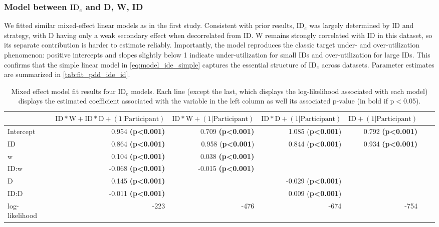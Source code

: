 \documentclass[acmlarge, manuscript,review]{acmart}
\newcommand{\ide}{\ensuremath{{\text{ID}_e}}\xspace}
\newcommand{\D}{\ensuremath{{\text{D}}}\xspace}
\newcommand{\W}{\ensuremath{{\text{W}}}\xspace}
\begin{document}
\subsubsection{Model between \ide and D, W, ID}
We fitted similar mixed-effect linear models as in the first study. Consistent with prior results, \ide was largely determined by ID and strategy, with D having only a weak secondary effect when decorrelated from ID. W remains strongly correlated with ID in this dataset, so its separate contribution is harder to estimate reliably. Importantly, the model reproduces the classic target under- and over-utilization phenomenon: positive intercepts and slopes slightly below 1 indicate under-utilization for small IDs and over-utilization for large IDs. This confirms that the simple linear model in \autoref{eq:model_ide_simple} captures the essential structure of 
\ide across datasets. Parameter estimates are summarized in \autoref{tab:fit_pdd_ide_id}.



\begin{table}
	\caption{Mixed effect model fit results four \ide models. Each line (except the last, which displays the log-likelihood associated with each model) displays the estimated coefficient associated with the variable in the left column as well its associated p-value (in bold if p$<$0.05).}
	\label{tab:fit_pdd_ide_id}
\begin{center}
	\begin{tabular}{lrrrrrr}
	\hline
			  &  $\text{ID}*\W + \text{ID}*\D + (1|\text{Participant})$ & $\text{ID}*\W + (1|\text{Participant})$ &  $ \text{ID}*\D + (1|\text{Participant})$ & $\text{ID}+ (1|\text{Participant})$  \\
	\hline
	Intercept &  0.954 \textbf{(p\textless0.001)} &    				0.709 \textbf{(p\textless0.001)} & 1.085 (\textbf{p\textless0.001})  & 0.792 \textbf{(p\textless0.001)} \\
	ID        &  0.864 \textbf{(p\textless0.001)} &    0.958 (\textbf{p\textless0.001}) &  0.844 (\textbf{p\textless0.001}) & 0.934 \textbf{(p\textless0.001)}  \\
	w         & 0.104 \textbf{(p\textless0.001)} & 0.038 \textbf{(p\textless0.001)}    &   & \\
	ID:w      & -0.068 \textbf{(p\textless0.001)} &    -0.015 \textbf{(p\textless0.001)}  &   & \\
	D         &  0.145 \textbf{(p\textless0.001)} &    &  -0.029 (\textbf{p\textless0.001})  & \\
	ID:D      & -0.011 \textbf{(p\textless0.001)} &     & 0.009 (\textbf{p\textless0.001})   & \\
	log-likelihood & -223 & -476 & -674  & -754\\
	\hline
	\end{tabular}
	\end{center}
	\end{table}
\end{document}
